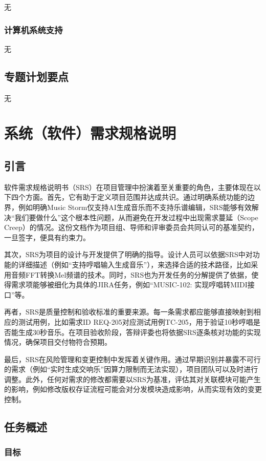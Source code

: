 \documentclass{base}
\begin{document}
无

\subsubsection{计算机系统支持}

无

\subsection{专题计划要点}

无

\section{系统（软件）需求规格说明}

\subsection{引言}

软件需求规格说明书（SRS）在项目管理中扮演着至关重要的角色，主要体现在以下四个方面。首先，它有助于定义项目范围并达成共识。通过明确系统功能的边界，例如明确Music Storm仅支持AI生成音乐而不支持乐谱编辑，SRS能够有效解决“我们要做什么”这个根本性问题，从而避免在开发过程中出现需求蔓延（Scope Creep）的情况。这份文档作为项目组、导师和评审委员会共同认可的基准契约，一旦签字，便具有约束力。

其次，SRS为项目的设计与开发提供了明确的指导。设计人员可以依据SRS中对功能的详细描述（例如“支持哼唱输入生成音乐”），来选择合适的技术路径，比如采用音频FFT转换Mel频谱的技术。同时，SRS也为开发任务的分解提供了依据，使得需求项能够被细化为具体的JIRA任务，例如“MUSIC-102: 实现哼唱转MIDI接口”等。

再者，SRS是质量控制和验收标准的重要来源。每一条需求都应能够直接映射到相应的测试用例，比如需求ID REQ-205对应测试用例TC-205，用于验证10秒哼唱是否能生成30秒音乐。在项目验收阶段，答辩评委也将依据SRS逐条核对功能的实现情况，确保项目交付物符合预期。

最后，SRS在风险管理和变更控制中发挥着关键作用。通过早期识别并暴露不可行的需求（例如“实时生成交响乐”因算力限制而无法实现），项目团队可以及时进行调整。此外，任何对需求的修改都需要以SRS为基准，评估其对关联模块可能产生的影响，例如修改版权存证流程可能会对分发模块造成影响，从而实现有效的变更控制。

\subsection{任务概述}
\subsubsection{目标}
\end{document}
